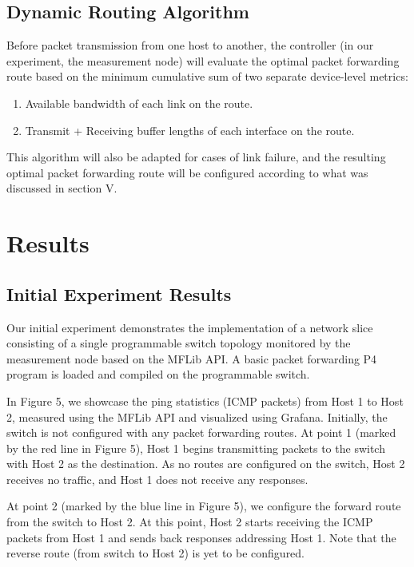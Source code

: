 \documentclass[conference]{IEEEtran}
\begin{document}
    \subsection{Dynamic Routing Algorithm}
      Before packet transmission from one host to another, the controller (in our experiment, the measurement node) will evaluate the optimal packet forwarding route based on the minimum cumulative sum of two separate device-level metrics:
      \begin{enumerate}
          \item Available bandwidth of each link on the route.
          \item Transmit + Receiving buffer lengths of each interface on the route.
      \end{enumerate}
      This algorithm will also be adapted for cases of link failure, and the resulting optimal packet forwarding route will be configured according to what was discussed in section V.

    \section{Results}
    \subsection{Initial Experiment Results}
    Our initial experiment demonstrates the implementation of a network slice consisting of a single programmable switch topology monitored by the measurement node based on the MFLib API.  A basic packet forwarding P4 program is loaded and compiled on the programmable switch.

    In Figure 5, we showcase the ping statistics (ICMP packets) from Host 1 to Host 2, measured using the MFLib API and visualized using Grafana.
    Initially, the switch is not configured with any packet forwarding routes. At point 1 (marked by the red line in Figure 5), Host 1 begins transmitting packets to the switch with Host 2 as the destination. As no routes are configured on the switch, Host 2 receives no traffic, and Host 1 does not receive any responses.

    At point 2 (marked by the blue line in Figure 5), we configure the forward route from the switch to Host 2. At this point, Host 2 starts receiving the ICMP packets from Host 1 and sends back responses addressing Host 1. Note that the reverse route (from switch to Host 2) is yet to be configured.
\end{document}
